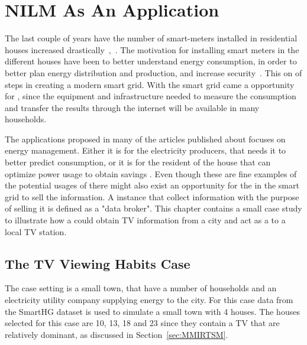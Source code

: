 \chapter{NILM As An Application} 
\label{sec:CaseStudy}
The last couple of years have the number of smart-meters installed in residential houses increased drastically~\citep{RefWorks:44},~\citep{RefWorks:45}. The motivation for installing smart meters in the different houses have been to better understand energy consumption, in order to better plan energy distribution and production, and increase security~\citep{RefWorks:43}. This on of steps in creating a modern smart grid. With the smart grid came a opportunity for , since the equipment and infrastructure needed to measure the consumption and transfer the results through the internet will be available in many households. 

The applications proposed in many of the articles published about  focuses on energy management. Either it is for the electricity producers, that needs it to better predict consumption, or it is for the resident of the house that can optimize power usage to obtain savings \citep{RefWorks:17}. Even though these are fine examples of the potential usages of  there might also exist an opportunity for the  in the smart grid to sell the  information. A instance that collect information with the purpose of selling it is defined as a "data broker". This chapter contains a small case study to illustrate how a  could obtain TV information from a city and act as a  to a local TV station. 

\section{The TV Viewing Habits Case}
The case setting is a small town, that have a number of households and an electricity utility company supplying energy to the city. For this case data from the SmartHG dataset is used to simulate a small town with 4 houses. The houses selected for this case are 10, 13, 18 and 23  since they contain a TV that are relatively dominant, as discussed in Section~\ref{sec:MMIRTSM}. 

